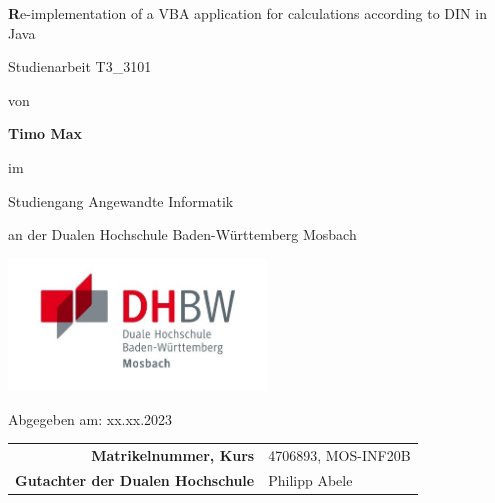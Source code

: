 
\def\title{Re-implementation of a VBA application for calculations according to DIN in Java}
\def\abgabe{xx.xx.2023}

\begin{titlepage}
	
	
	
	\vspace{5pt}
	
	\begin{center}
		
		\Large \textbf\title
		
		\vspace{50pt}
		
		\large Studienarbeit T3\_3101
		
		von 
		
		\large \textbf{Timo Max} 
		
		\vspace{15pt}
		
		im
		
		\large Studiengang Angewandte Informatik
		
		an der Dualen Hochschule Baden-Württemberg Mosbach

        \vspace{10pt}

        \includegraphics[height=3.5cm]{images/dhbw-logo.jpg}
		
		\vspace{20pt}
		
		\large Abgegeben am: \abgabe
		
		\vspace{30pt}

		
		\begin{table}[h]
			\centering
			\begin{tabular}{r l}
				\large\textbf{Matrikelnummer, Kurs} & \large 4706893, MOS-INF20B \\
                \large\textbf{Gutachter der Dualen Hochschule} & \large Philipp Abele \\
			\end{tabular}
			
		\end{table}
		
	\end{center}
	
	
\end{titlepage}